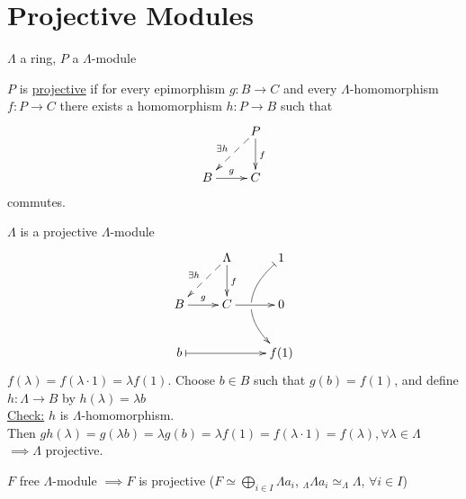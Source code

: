 \section{Projective Modules}
$\Lambda$ a ring, $P$ a $\Lambda$-module
\begin{defin}
$P$ is \underline{projective} if for every epimorphism $g: B \to C$ and every  $\Lambda$-homomorphism $f: P \to C$ there exists a homomorphism $h: P \to B$ such that
$$\xymatrix{
& P\ar[d]^f \ar@{-->}[ld]_{\exists h}\\
B \ar[r]^g & C
}$$ commutes.
\end{defin}

\begin{exam}
$\Lambda$ is a projective $\Lambda$-module
$$\xymatrix{
& \Lambda\ar[d]^f \ar@{-->}[ld]_{\exists h} & 1\ar@/_2pc/@{|->}[dd]|\hole\\
B \ar[r]^g & C \ar[r] & 0\\
b\ar@{|->}[rr] && f(1)
}$$
$f(\lambda) = f(\lambda \cdot 1) = \lambda f(1)$. Choose $b \in B$ such that $g(b) = f(1)$, and define $h: \Lambda \to B$ by $h(\lambda) = \lambda b$\\
\underline{Check:} $h$ is $\Lambda$-homomorphism.\\
Then $gh(\lambda) = g(\lambda b) = \lambda g(b) = \lambda f(1) = f(\lambda \cdot 1) = f(\lambda), \forall \lambda \in \Lambda$\\
$\implies \Lambda$ projective.
\end{exam}

\begin{exer}
$F$ free $\Lambda$-module $\implies F$ is projective ($F \simeq \bigoplus_{i \in I} \Lambda a_i$, $_\Lambda \Lambda a_i \simeq _\Lambda \Lambda$, $\forall i \in I$)
\end{exer}

